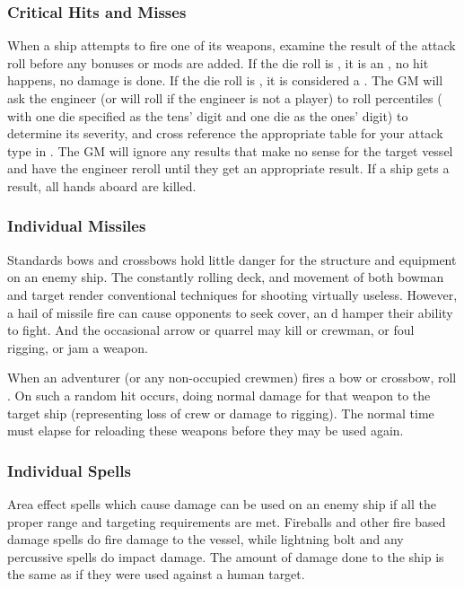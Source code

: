 \begin{multicols*}{2}
\subsubsection{Critical Hits and Misses}
When a ship attempts to fire one of its weapons, examine the result of the attack roll before any bonuses or mods are added. If the die roll is , it is an , no hit happens, no damage is done. If the die roll is , it is considered a . The GM will ask the engineer (or will roll if the engineer is not a player) to roll percentiles ( with one die specified as the tens' digit and one die as the ones' digit) to determine its severity, and cross reference the appropriate table for your attack type in . The GM  will ignore any results that make no sense for the target vessel and have the engineer reroll until they get an appropriate result. If a ship gets a  result, all hands aboard are killed.
\subsubsection{Individual Missiles}
Standards bows and crossbows hold little danger
for the structure and equipment on an enemy ship. The constantly rolling deck, and movement of both bowman and target render conventional techniques for shooting virtually useless. However, a hail of missile fire can cause opponents to seek cover, an d hamper their ability to fight. And the occasional arrow or quarrel may kill or crewman, or foul rigging, or jam a weapon.

When an adventurer (or any non-occupied crewmen) fires a bow or crossbow, roll . On  such a random hit occurs, doing normal damage for that weapon to the target ship (representing loss of crew or damage to rigging). The normal time must elapse for reloading these weapons before they may be used again.
\subsubsection{Individual Spells}
Area effect spells which cause damage can be used on an enemy ship if all the proper range and targeting requirements are met. Fireballs and other fire based damage spells do fire damage to the vessel, while lightning bolt and any percussive spells do impact damage. The amount of damage done to the ship is the same as if they were used against a human target.

\end{multicols*}
